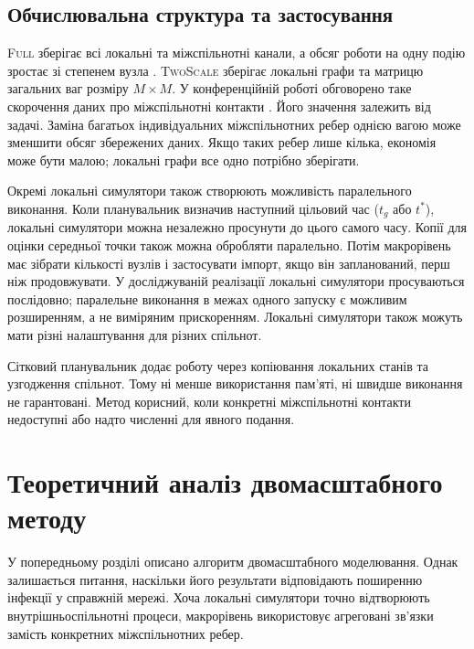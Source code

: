 \documentclass[a4paper,fleqn]{cas-sc}
\newcommand{\Full}{\textup{\textsc{Full}}}
\newcommand{\TS}{\textup{\textsc{TwoScale}}}
\begin{document}
\subsection{Обчислювальна структура та застосування}
\label{sec:cost}

\Full{} зберігає всі локальні та міжспільнотні канали, а обсяг роботи на одну подію зростає зі степенем вузла \citep{kuryliak2025simulating}. \TS{} зберігає локальні графи та матрицю загальних ваг розміру $M\times M$. У конференційній роботі обговорено таке скорочення даних про міжспільнотні контакти \citep{kuryliak2025towards}. Його значення залежить від задачі. Заміна багатьох індивідуальних міжспільнотних ребер однією вагою може зменшити обсяг збережених даних. Якщо таких ребер лише кілька, економія може бути малою; локальні графи все одно потрібно зберігати.

Окремі локальні симулятори також створюють можливість паралельного виконання. Коли планувальник визначив наступний цільовий час ($t_g$ або $t^\ast$), локальні симулятори можна незалежно просунути до цього самого часу. Копії для оцінки середньої точки також можна обробляти паралельно. Потім макрорівень має зібрати кількості вузлів і застосувати імпорт, якщо він запланований, перш ніж продовжувати. У досліджуваній реалізації локальні симулятори просуваються послідовно; паралельне виконання в межах одного запуску є можливим розширенням, а не виміряним прискоренням. Локальні симулятори також можуть мати різні налаштування для різних спільнот.

Сітковий планувальник додає роботу через копіювання локальних станів та узгодження спільнот. Тому ні менше використання пам'яті, ні швидше виконання не гарантовані. Метод корисний, коли конкретні міжспільнотні контакти недоступні або надто численні для явного подання.



\section{Теоретичний аналіз двомасштабного методу }
\label{sec:analysis}

У попередньому розділі описано алгоритм двомасштабного моделювання. Однак залишається питання, наскільки його результати відповідають поширенню інфекції у справжній мережі. Хоча локальні симулятори точно відтворюють внутрішньоспільнотні процеси, макрорівень використовує агреговані зв'язки замість конкретних міжспільнотних ребер.
\end{document}
